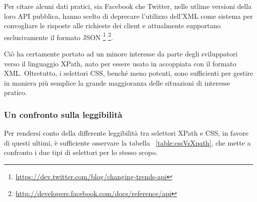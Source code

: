 Per citare alcuni dati pratici, sia Facebook che Twitter, nelle utlime versioni della loro API pubblica, hanno scelto di deprecare l'utilizzo dell'XML come sistema per convogliare le risposte alle richieste dei client e attualmente supportano esclusivamente il formato JSON \footnote{\url{https://dev.twitter.com/blog/changing-trends-api}} \footnote{\url{http://developers.facebook.com/docs/reference/api}}.

Ciò ha certamente portato ad un minore interesse da parte degli sviluppatori verso il linguaggio XPath, nato per essere usato in accoppiata con il formato XML. Oltretutto, i selettori CSS, benché meno potenti, sono sufficienti per gestire in maniera più semplice la grande maggioranza delle situazioni di interesse pratico.  

\subsubsection{Un confronto sulla leggibilità}

Per rendersi conto della differente leggibilità tra selettori XPath e CSS, in favore di questi ultimi, è sufficiente osservare la tabella ~\ref{table:cssVsXpath}, che mette a confronto i due tipi di selettori per lo stesso scopo. 

